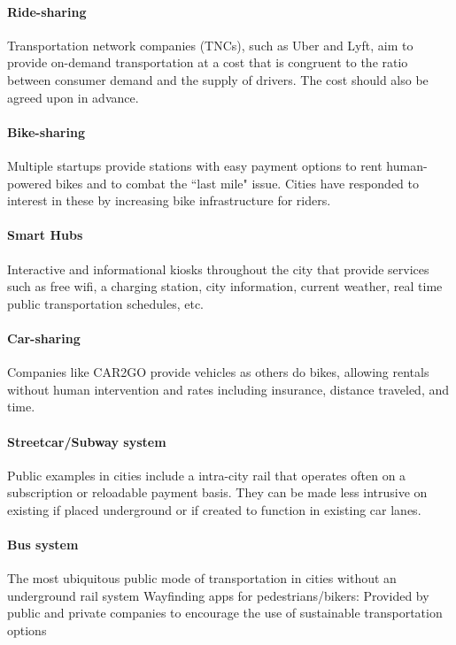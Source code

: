 \documentclass[12pt]{article}                         %
\begin{document}
\paragraph{Ride-sharing} Transportation network companies (TNCs), such as Uber and Lyft, aim to provide on-demand transportation at a cost that is congruent to the ratio between consumer demand and the supply of drivers. The cost should also be agreed upon in advance.

\paragraph{Bike-sharing} Multiple startups provide stations with easy payment options to rent human-powered bikes and to combat the “last mile" issue. Cities have responded to interest in these by increasing bike infrastructure for riders.

\paragraph{Smart Hubs} Interactive and informational kiosks throughout the city that provide services such as free wifi, a charging station, city information, current weather, real time public transportation schedules, etc. 

\paragraph{Car-sharing} Companies like CAR2GO provide vehicles as others do bikes, allowing rentals without human intervention and rates including insurance, distance traveled, and time.

\paragraph{Streetcar/Subway system} Public examples in cities include a intra-city rail that operates often on a subscription or reloadable payment basis. They can be made less intrusive on existing if placed underground or if created to function in existing car lanes.

\paragraph{Bus system} The most ubiquitous public mode of transportation in cities without an underground rail system
Wayfinding apps for pedestrians/bikers: Provided by public and private companies to encourage the use of sustainable transportation options
\end{document}
